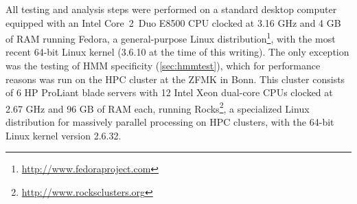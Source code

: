 All testing and analysis steps were performed on a standard desktop computer
equipped with an Intel \mbox{Core 2 Duo} E8500 CPU clocked at 3.16 GHz and 4 GB
of RAM running Fedora, a general-purpose Linux
distribution\footnote{\url{http://www.fedoraproject.com}}, with the most recent
64-bit Linux kernel (3.6.10 at the time of this writing). The only exception was
the testing of HMM specificity (\autoref{sec:hmmtest}), which for performance
reasons was run on the HPC cluster at the ZFMK in Bonn. This cluster consists of
6 HP ProLiant blade servers with 12 Intel Xeon dual-core CPUs clocked at 2.67
GHz and 96 GB of RAM each, running
Rocks\footnote{\url{http://www.rocksclusters.org}}, a specialized Linux
distribution for massively parallel processing on HPC clusters, with the 64-bit
Linux kernel version 2.6.32.
